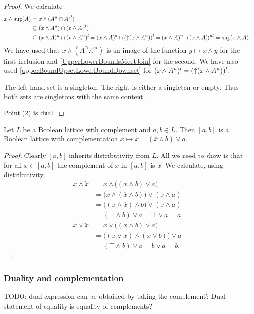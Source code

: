 \begin{proof}
We calculate
\begin{align*}
x\wedge \sup(A) &= x\wedge (A^u\cap A^{ul}) \\
&\subseteq (x\wedge A^u)\cap (x\wedge A^{ul}) \\
&\subseteq (x\wedge A)^u\cap (x\wedge A^{u})^l = (x\wedge A)^u\cap (\operatorname{\uparrow}(x\wedge A^{u}))^l = (x\wedge A)^u\cap (x\wedge A))^{ul} = \sup(x\wedge A).
\end{align*}
We have used that $x\wedge (A^\cap A^{ul})$ is an image of the function $y\mapsto x\wedge y$ for the first inclusion and \ref{UpperLowerBoundsMeetJoin} for the second. We have also used \ref{upperBoundUpsetLowerBoundDownset} for $(x\wedge A^{u})^l = (\operatorname{\uparrow}(x\wedge A^{u}))^l$.

The left-hand set is a singleton. The right is either a singleton or empty. Thus both sets are singletons with the same content.

Point (2) is dual.
\end{proof}

\begin{proposition}
Let $L$ be a Boolean lattice with complement and $a,b\in L$. Then $[a,b]$ is a Boolean lattice with complementation $x\mapsto \widetilde{x} = (\overline{x} \wedge b)\vee a$. 
\end{proposition}
\begin{proof}
Clearly $[a,b]$ inherits distributivity from $L$. All we need to show is that for all $x\in [a,b]$ the complement of $x$ in $[a,b]$ is $\widetilde{x}$. We calculate, using distributivity,
\begin{align*}
x \wedge \widetilde{x} &= x\wedge \big((\overline{x} \wedge b)\vee a\big) \\
&= \big(x\wedge(\overline{x} \wedge b)\big)\vee (x\wedge a) \\
&= \big(( x\wedge \overline{x}) \wedge b\big)\vee (x\wedge a) \\
&= (\bot \wedge b)\vee a = \bot \vee a = a \\
x \vee \widetilde{x} &= x\vee \big((\overline{x} \wedge b)\vee a\big) \\
&= \big((x\vee \overline{x}) \wedge (x\vee b)\big)\vee a \\
&= (\top \wedge b) \vee a = b\vee a = b.
\end{align*}
\end{proof}



\subsubsection{Duality and complementation}
TODO: dual expression can be obtained by taking the complement? Dual statement of equality is equality of complements?


